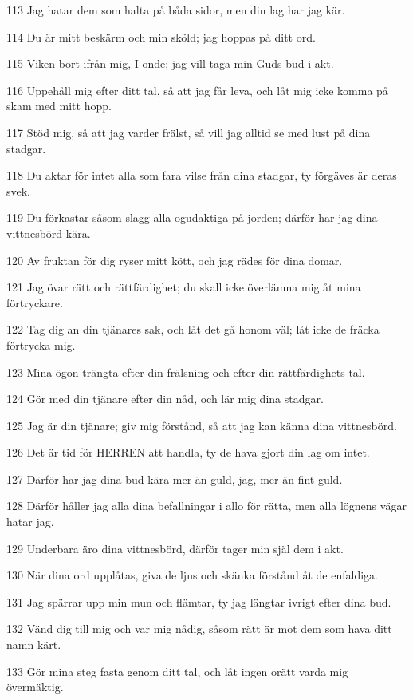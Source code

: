 \par 113 Jag hatar dem som halta på båda sidor, men din lag har jag kär.
\par 114 Du är mitt beskärm och min sköld; jag hoppas på ditt ord.
\par 115 Viken bort ifrån mig, I onde; jag vill taga min Guds bud i akt.
\par 116 Uppehåll mig efter ditt tal, så att jag får leva, och låt mig icke komma på skam med mitt hopp.
\par 117 Stöd mig, så att jag varder frälst, så vill jag alltid se med lust på dina stadgar.
\par 118 Du aktar för intet alla som fara vilse från dina stadgar, ty förgäves är deras svek.
\par 119 Du förkastar såsom slagg alla ogudaktiga på jorden; därför har jag dina vittnesbörd kära.
\par 120 Av fruktan för dig ryser mitt kött, och jag rädes för dina domar.
\par 121 Jag övar rätt och rättfärdighet; du skall icke överlämna mig åt mina förtryckare.
\par 122 Tag dig an din tjänares sak, och låt det gå honom väl; låt icke de fräcka förtrycka mig.
\par 123 Mina ögon trängta efter din frälsning och efter din rättfärdighets tal.
\par 124 Gör med din tjänare efter din nåd, och lär mig dina stadgar.
\par 125 Jag är din tjänare; giv mig förstånd, så att jag kan känna dina vittnesbörd.
\par 126 Det är tid för HERREN att handla, ty de hava gjort din lag om intet.
\par 127 Därför har jag dina bud kära mer än guld, jag, mer än fint guld.
\par 128 Därför håller jag alla dina befallningar i allo för rätta, men alla lögnens vägar hatar jag.
\par 129 Underbara äro dina vittnesbörd, därför tager min själ dem i akt.
\par 130 När dina ord upplåtas, giva de ljus och skänka förstånd åt de enfaldiga.
\par 131 Jag spärrar upp min mun och flämtar, ty jag längtar ivrigt efter dina bud.
\par 132 Vänd dig till mig och var mig nådig, såsom rätt är mot dem som hava ditt namn kärt.
\par 133 Gör mina steg fasta genom ditt tal, och låt ingen orätt varda mig övermäktig.
